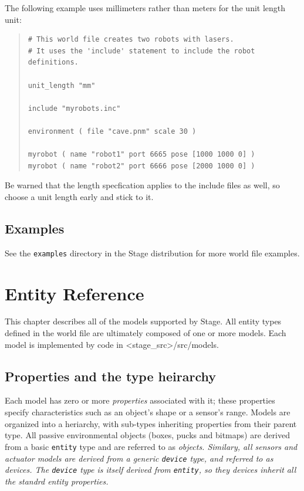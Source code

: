 \documentclass[11pt,twoside]{report}
\begin{document}
\noindent The following example uses millimeters rather than meters
for the unit length unit:
\begin{quote}
\begin{verbatim}
# This world file creates two robots with lasers.
# It uses the 'include' statement to include the robot definitions.

unit_length "mm"

include "myrobots.inc"

environment ( file "cave.pnm" scale 30 )

myrobot ( name "robot1" port 6665 pose [1000 1000 0] )
myrobot ( name "robot2" port 6666 pose [2000 1000 0] )
\end{verbatim}
\end{quote}
Be warned that the length specfication applies to the include files as well,
so choose a unit length early and stick to it.


\section{Examples}

See the {\tt examples} directory in the Stage distribution for more
world file examples.


\chapter{Entity Reference}

This chapter describes all of the models supported by Stage.  All
entity types defined in the world file are ultimately composed of one
or more models. Each model is implemented by code in
<stage\_src>/src/models.


\section{Properties and the type heirarchy}

Each model has zero or more {\em properties} associated with it; these
properties specify characteristics such as an object's shape or a
sensor's range.  Models are organized into a heriarchy, with sub-types
inheriting properties from their parent type.  All passive
environmental objects (boxes, pucks and bitmaps) are derived from a
basic \verb'entity' type and are referred to as \em{objects}.
Similary, all sensors and actuator models are derived from a generic
\verb'device' type, and referred to as \em{devices}. The \verb'device'
type is itself derived from \verb'entity', so they devices inherit all
the standrd entity properties. 
\end{document}
